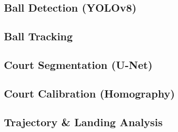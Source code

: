 \subsection{Ball Detection (YOLOv8)}

\subsection{Ball Tracking}

\subsection{Court Segmentation (U-Net)}

\subsection{Court Calibration (Homography)}

\subsection{Trajectory \& Landing Analysis}

